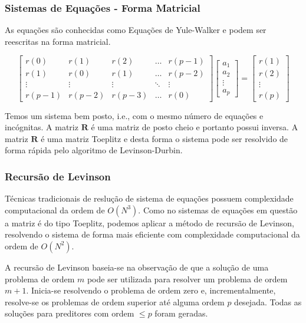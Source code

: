\begin{frame}
  \frametitle{Sistemas de Equações - Forma Matricial}

  As equações são conhecidas como Equações de Yule-Walker e podem ser reescritas na forma matricial.

  \begin{equation}
  \begin{bmatrix}
  r(0) & r(1) & r(2) & \ldots & r(p-1) \\
  r(1) & r(0) & r(1) & \ldots & r(p-2) \\
  \vdots & \vdots & \vdots & \ddots & \vdots \\
  r(p-1) & r(p-2) & r(p-3) & \ldots & r(0)
  \end{bmatrix}
  \begin{bmatrix} a_1 \\ a_2 \\ \vdots \\ a_p \end{bmatrix} = 
  \begin{bmatrix} r(1) \\ r(2) \\ \vdots \\ r(p) \end{bmatrix}
  \end{equation}

  Temos um sistema bem posto, i.e., com o mesmo número de equações e incógnitas. A matriz $\mathbf{R}$ é uma matriz de posto cheio
 e portanto possui inversa. A matriz $\mathbf{R}$ é uma matriz Toeplitz e desta forma o sistema pode ser resolvido de forma rápida
  pelo algoritmo de Levinson-Durbin.
\end{frame}


\begin{frame}
  \frametitle{Recursão de Levinson}

  Técnicas tradicionais de reslução de sistema de equações possuem complexidade computacional
  da ordem de $O(N^3)$. Como no sistemas de equações em questão a matriz é do tipo Toeplitz,
  podemos aplicar a método de recursão de Levinson, resolvendo o sistema de forma mais eficiente
  com complexidade computacional da ordem de $O(N^2)$.

  A recursão de Levinson baseia-se na observação de que a solução de uma problema de ordem $m$
  pode ser utilizada para resolver um problema de ordem $m+1$. Inicia-se resolvendo o problema
  de ordem zero e, incrementalmente, resolve-se os problemas de ordem superior até alguma ordem $p$
  desejada. Todas as soluções para preditores com ordem $\leq p$ foram geradas.

\end{frame}


